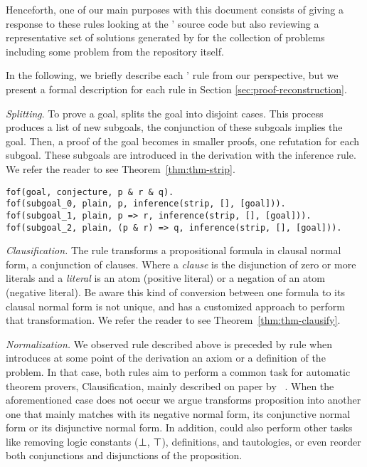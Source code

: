 \documentclass[../main.tex]{subfiles}
\begin{document}
Henceforth, one of our main purposes with this document consists of
giving a response to these rules looking at the \Metis' source code but also reviewing a representative set of solutions generated by
\Metis for the \CPL collection of \TPTP problems~\cite{Prieto-Cubides2017} including some problem from the \Metis repository itself.

In the following, we briefly describe each \Metis' rule from our perspective, but we present a formal description for each rule in Section \ref{sec:proof-reconstruction}.

\vskip 2mm


\textit{Splitting}. To prove a goal, \Metis splits the goal into
disjoint cases. This process produces a list of new subgoals, the
conjunction of these subgoals implies the goal. Then, a proof of the
goal becomes in smaller proofs, one refutation for each subgoal.
These subgoals are introduced in the \TSTP derivation with the \strip
inference rule. We refer the reader to see Theorem~\ref{thm:thm-strip}.

\begin{verbatim}
fof(goal, conjecture, p & r & q).
fof(subgoal_0, plain, p, inference(strip, [], [goal])).
fof(subgoal_1, plain, p => r, inference(strip, [], [goal])).
fof(subgoal_2, plain, (p & r) => q, inference(strip, [], [goal])).
\end{verbatim}


\textit{Clausification.} The \clausify rule transforms a
propositional formula in clausal normal form, a conjunction
of clauses. Where a \emph{clause} is the disjunction of zero or more
literals and a \emph{literal} is an atom (positive literal) or a
negation of an atom (negative literal). Be aware this kind of conversion between one formula to its clausal normal form is not unique, and \Metis has a customized approach to perform that transformation. We refer the reader to see Theorem~\ref{thm:thm-clausify}.

\vskip 2mm


\textit{Normalization.} We observed \clausify rule described above is preceded by \canonicalize rule when \Metis introduces at some point of the derivation an axiom or a definition of the problem. In that case, both rules aim to perform a common task for
automatic theorem provers, Clausification, mainly described on paper
by \citeauthor{Sutcliffe1996}~\cite{Sutcliffe1996}. When the
aforementioned case does not occur we argue \canonicalize transforms
proposition into another one that mainly matches with its negative
normal form, its conjunctive normal form or its disjunctive normal
form. In addition, \canonicalize could also perform other tasks like
removing logic constants (⊥, ⊤), definitions, and tautologies, or even reorder both conjunctions and disjunctions of the proposition.
\end{document}
